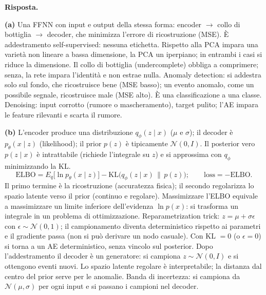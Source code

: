 \documentclass[11pt,a4paper]{article}
\newcommand{\Ris}[1]{\noindent\textbf{Risposta.}\par\nopagebreak #1}
\begin{document}
\Ris{
\textbf{(a)} Una FFNN con input e output della stessa forma: encoder $\to$ collo di bottiglia $\to$ decoder, che minimizza l'errore di ricostruzione (MSE). \`E addestramento self-supervised: nessuna etichetta.
Rispetto alla PCA impara una variet\`a non lineare a bassa dimensione, la PCA un iperpiano; in entrambi i casi si riduce la dimensione.
Il collo di bottiglia (undercomplete) obbliga a comprimere; senza, la rete impara l'identit\`a e non estrae nulla.
Anomaly detection: si addestra solo sul fondo, che ricostruisce bene (MSE basso); un evento anomalo, come un possibile segnale, ricostruisce male (MSE alto). \`E una classificazione a una classe.
Denoising: input corrotto (rumore o mascheramento), target pulito; l'AE impara le feature rilevanti e scarta il rumore.

\textbf{(b)} L'encoder produce una distribuzione $q_\phi(z\mid x)$ ($\mu$ e $\sigma$); il decoder \`e $p_\theta(x\mid z)$ (likelihood); il prior $p(z)$ \`e tipicamente $\mathcal N(0,I)$.
Il posterior vero $p(z\mid x)$ \`e intrattabile (richiede l'integrale su $z$) e si approssima con $q_\phi$ minimizzando la KL.
\[
\mathrm{ELBO}=E_{q}\bigl[\ln p_\theta(x\mid z)\bigr]-\mathrm{KL}\bigl(q_\phi(z\mid x)\,\|\,p(z)\bigr);\qquad\text{loss}=-\mathrm{ELBO}.
\]
Il primo termine \`e la ricostruzione (accuratezza fisica); il secondo regolarizza lo spazio latente verso il prior (continuo e regolare).
Massimizzare l'ELBO equivale a massimizzare un limite inferiore dell'evidenza $\ln p(x)$: si trasforma un integrale in un problema di ottimizzazione.
Reparametrization trick: $z=\mu+\sigma\epsilon$ con $\epsilon\sim\mathcal N(0,1)$; il campionamento diventa deterministico rispetto ai parametri e il gradiente passa (non si pu\`o derivare un nodo casuale).
Con KL $=0$ (o $\epsilon=0$) si torna a un AE deterministico, senza vincolo sul posterior.
Dopo l'addestramento il decoder \`e un generatore: si campiona $z\sim\mathcal N(0,I)$ e si ottengono eventi nuovi. Lo spazio latente regolare \`e interpretabile; la distanza dal centro del prior serve per le anomalie.
Banda di incertezza: si campiona da $\mathcal N(\mu,\sigma)$ per ogni input e si passano i campioni nel decoder.

}
\end{document}
